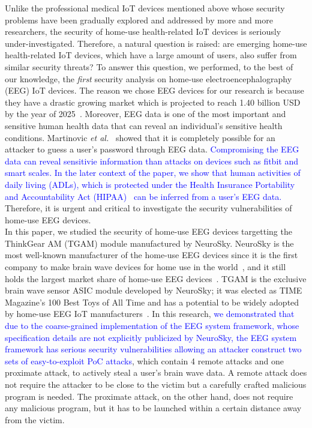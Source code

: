 \indent Unlike the professional medical IoT devices mentioned above whose security problems have been gradually explored and addressed by more and more researchers, the security of home-use health-related IoT devices is seriously under-investigated. Therefore, a natural question is raised: are emerging home-use health-related IoT devices, which have a large amount of users, also suffer from similar security threats? To answer this question, we performed, to the best of our knowledge, the \emph{first} security analysis on home-use electroencephalography (EEG) IoT devices. The reason we chose EEG devices for our research is because they have a drastic growing market which is projected to reach 1.40 billion USD by the year of 2025~\cite{2025eegdevicemarket}. Moreover, EEG data is one of the most important and sensitive human health data that can reveal an individual's sensitive health conditions. Martinovic \emph{et al.}~\cite{martinovic2012feasibility} showed that it is completely possible for an attacker to guess a user's password through EEG data. \textcolor{blue}{Compromising the EEG data can reveal sensitivie information than attacks on devices such as fitbit and smart scales. In the later context of the paper, we show that human activities of daily living (ADLs), which is protected under the Health Insurance Portability and Accountability Act (HIPAA)~\cite{hipaa} can be inferred from a user's EEG data.} Therefore, it is urgent and critical to investigate the security vulnerabilities of home-use EEG devices.\\
\indent In this paper, we studied the security of home-use EEG devices targetting the ThinkGear AM (TGAM) module manufactured by NeuroSky. NeuroSky is the most well-known manufacturer of the home-use EEG devices since it is the first company to make brain wave devices for home use in the world~\cite{firsthomeeeg}, and it still holds the largest market share of home-use EEG devices~\cite{neuroskymarket}. TGAM is the exclusive brain wave sensor ASIC module developed by NeuroSky; it was elected as TIME Magazine's 100 Best Toys of All Time and has a potential to be widely adopted by home-use EEG IoT manufacturers~\cite{tgammarket}. In this research, \textcolor{blue}{ we demonstrated that due to the coarse-grained implementation of the EEG system framework, whose specification details are not explicitly publicized by NeuroSky, the EEG system framework has serious security vulnerabilities allowing an attacker construct two sets of easy-to-exploit PoC attacks}, which contain 4 remote attacks and one proximate attack, to actively steal a user's brain wave data. A remote attack does not require the attacker to be close to the victim but a carefully crafted malicious program is needed. The proximate attack, on the other hand, does not require any malicious program, but it has to be launched within a certain distance away from the victim. %

